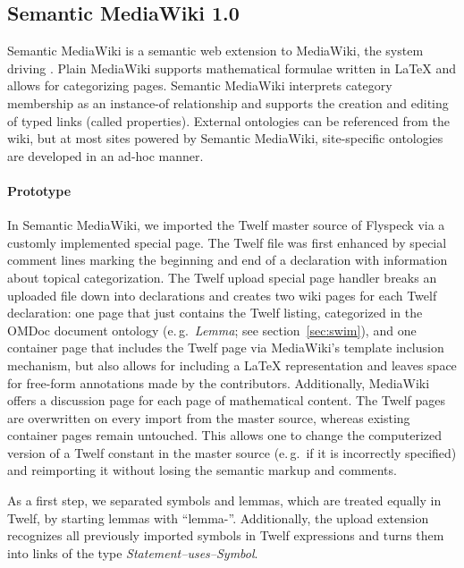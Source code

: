\subsection{Semantic MediaWiki 1.0}
\label{sec:smw-study}

Semantic MediaWiki\cite{KrSchVr:semwiki-reasoning07} is a semantic web extension
to MediaWiki, the system driving .  Plain MediaWiki supports
mathematical formulae written in {\LaTeX} and allows for categorizing pages.
Semantic MediaWiki interprets category membership as an instance-of relationship
and supports the creation and editing of typed links (called properties).
External ontologies can be referenced from the wiki, but at most sites powered
by Semantic MediaWiki, site-specific ontologies are developed in an ad-hoc
manner\cite{ontoworld:sites-using-smw}.

\paragraph{Prototype} In Semantic MediaWiki, we imported the Twelf master source
of Flyspeck via a customly implemented special page.  The Twelf file was first
enhanced by special comment lines marking the beginning and end of a declaration
with information about topical categorization.  The Twelf upload special page
handler breaks an uploaded file down into declarations and creates two wiki
pages for each Twelf declaration: one page that just contains the Twelf listing,
categorized in the OMDoc document ontology (e.\,g.\ \textit{Lemma}; see
section~\ref{sec:swim}), and one container page that includes the Twelf page via
MediaWiki's template inclusion mechanism, but also allows for including a
{\LaTeX} representation and leaves space for free-form annotations made by the
contributors.  Additionally, MediaWiki offers a discussion page for each page of
mathematical content.  The Twelf pages are overwritten on every import from the
master source, whereas existing container pages remain untouched.  This allows
one to change the computerized version of a Twelf constant in the master source
(e.\,g.\ if it is incorrectly specified) and reimporting it without losing the
semantic markup and comments.

As a first step, we separated symbols and lemmas, which are treated equally in Twelf, by starting lemmas with
``lemma-''. Additionally, the
upload extension recognizes all previously imported symbols in Twelf expressions
and turns them into links of the type \textit{Statement--uses--Symbol}.

